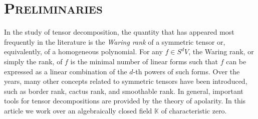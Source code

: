 \documentclass[a4paper,11pt,reqno]{amsart}
\newcommand{\bbK}{\mathbb{K}}
\numberwithin{equation}{section}
\theoremstyle{definition}
\theoremstyle{plain}
\theoremstyle{remark}
\begin{document}
\section{\normalfont \scshape{}\selectfont Preliminaries}\label{sec:prelims}
\noindent
In the study of tensor decomposition, the quantity that has appeared most frequently in the literature is the \textit{Waring rank} of a
symmetric tensor or, equivalently, of a homogeneous polynomial. For any $f\in
S^dV$, the Waring rank, or simply the rank, of $f$ is {the} minimal number of linear
forms such that $f$ can be expressed as a linear combination of the $d$-th
powers of such forms. Over the years, many other concepts related to
symmetric tensors have been introduced, such as border rank, cactus rank, and
smoothable rank. In general, important tools for tensor decompositions are provided by the theory of apolarity.
In this article we work over an algebraically closed field $\bbK$ of
characteristic zero.
\end{document}
